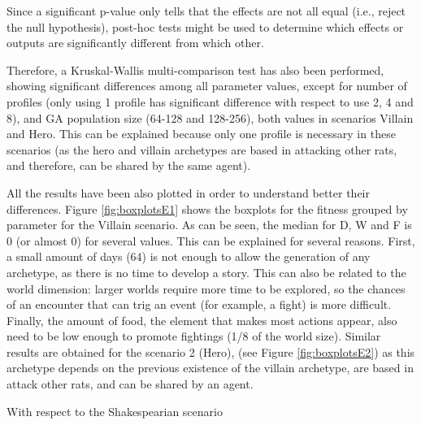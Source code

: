 \documentclass[runningheads,a4paper]{llncs}
\begin{document}
Since a significant p-value only tells  that the effects are not all
equal (i.e., reject the null hypothesis), post-hoc tests might be used
to determine which effects or outputs are significantly different from
which other. %

Therefore, a Kruskal-Wallis multi-comparison test has also been
performed, showing significant differences among all parameter values,
except for number of profiles (only using 1 profile has significant
difference with respect to use 2, 4 and 8), and GA population size
(64-128 and 128-256), both values in scenarios Villain and Hero. This
can be explained because only one profile is necessary in these
scenarios (as the hero and villain archetypes are based in attacking
other rats, and therefore, can be shared by the same agent).  %

All the results have been also plotted in order to  understand better
their differences. Figure \ref{fig:boxplotsE1} shows the boxplots for
the fitness grouped by parameter for the Villain scenario. As can be
seen, the median for D, W and F is 0 (or almost 0) for several
values. This can be explained for several reasons. First, a small
amount of days (64) is not enough to allow the generation of any
archetype, as there is no time to develop a story. This can also be
related to the world dimension: larger worlds require more time to be
explored, so the chances of an encounter that can trig an event (for
example, a fight) is more difficult. Finally, the amount of food, the
element that makes most actions appear, also need to be low enough to
promote fightings (1/8 of the world size). Similar results are
obtained for the scenario 2 (Hero), (see Figure \ref{fig:boxplotsE2})
as this archetype depends on the previous existence of the villain
archetype, are based in attack other rats, and can be shared by an
agent. 

With respect to the Shakespearian scenario %

\end{document}
